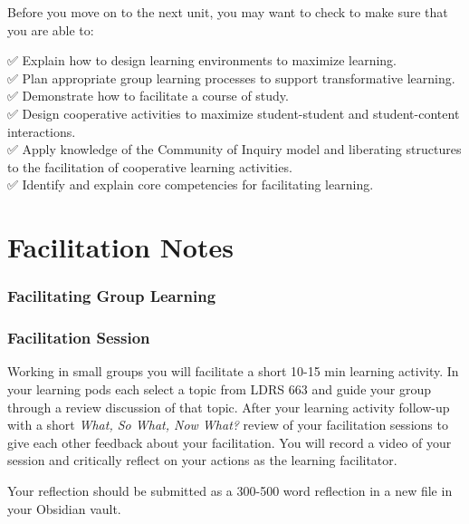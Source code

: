 \documentclass[
]{book}
\begin{document}
Before you move on to the next unit, you may want to check to make sure that you are able to:

✅ Explain how to design learning environments to maximize learning.\\
✅ Plan appropriate group learning processes to support transformative learning.\\
✅ Demonstrate how to facilitate a course of study.\\
✅ Design cooperative activities to maximize student-student and student-content interactions.\\
✅ Apply knowledge of the Community of Inquiry model and liberating structures to the facilitation of cooperative learning activities.\\
✅ Identify and explain core competencies for facilitating learning.

\hypertarget{facilitation-notes}{%
\section*{Facilitation Notes}\label{facilitation-notes}}

\hypertarget{facilitating-group-learning}{%
\subsubsection*{Facilitating Group Learning}\label{facilitating-group-learning}}

\hypertarget{facilitation-session}{%
\subsubsection*{Facilitation Session}\label{facilitation-session}}

Working in small groups you will facilitate a short 10-15 min learning activity. In your learning pods each select a topic from LDRS 663 and guide your group through a review discussion of that topic. After your learning activity follow-up with a short \emph{What, So What, Now What?} review of your facilitation sessions to give each other feedback about your facilitation. You will record a video of your session and critically reflect on your actions as the learning facilitator.

Your reflection should be submitted as a 300-500 word reflection in a new file in your Obsidian vault.
\end{document}
